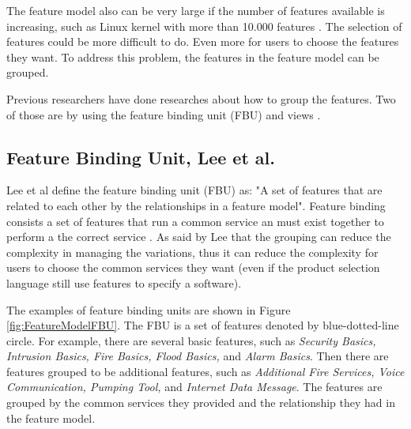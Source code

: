 The feature model also can be very large if the number of features available is increasing, such as Linux kernel with more than 10.000 features \citep{book.apel.FeatureOrientedSoftware}. The selection of features could be more difficult to do. Even more for users to choose the features they want. To address this problem, the features in the feature model can be grouped.

Previous researchers have done researches about how to group the features. Two of those are by using the feature binding unit (FBU) \citep{paper.lee.featurebinding,paper.lee.featuremanagement} and views \citep{paper.hubaux2013.supportingMultiplePerspective}.

\subsection{Feature Binding Unit, Lee et al.}
Lee et al \citep{paper.lee.featuremanagement} define the feature binding unit (FBU) as: "A set of features that are related to each other by the relationships in a feature model". Feature binding consists a set of features that run a common service an must exist together to perform a the correct service \citep{paper.lee.featurebinding,paper.lee.featuremanagement}. As said by Lee \citep{paper.lee.featuremanagement} that the grouping can reduce the complexity in managing the variations, thus it can reduce the complexity for users to choose the common services they want (even if the product selection language still use features to specify a software).

The examples of feature binding units are shown in Figure \ref{fig:FeatureModelFBU}. The FBU is a set of features denoted by blue-dotted-line circle. For example, there are several basic features, such as {\it Security Basics, Intrusion Basics, Fire Basics, Flood Basics,} and {\it Alarm Basics}. Then there are features grouped to be additional features, such as {\it Additional Fire Services, Voice Communication, Pumping Tool,} and {\it Internet Data Message}. The features are grouped by the common services they provided and the relationship they had in the feature model.

